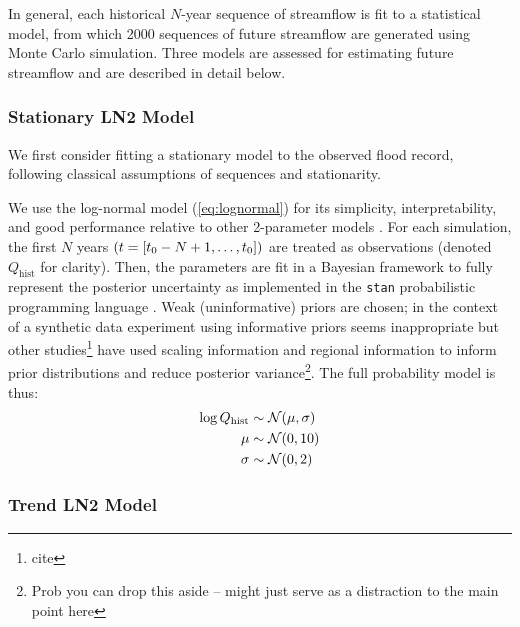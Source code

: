 \documentclass[12pt]{article}
\begin{document}
In general, each historical $N$-year sequence of streamflow is fit to a statistical model, from which 2000 sequences of future streamflow are generated using Monte Carlo simulation.
Three models are assessed for estimating future streamflow and are described in detail below.

\subsubsection{Stationary LN2 Model\label{sec:method-stationary}}

We first consider fitting a stationary model to the observed flood record, following classical assumptions of \iid sequences and stationarity.

We use the log-normal model (\cref{eq:lognormal}) for its simplicity, interpretability, and good performance relative to other 2-parameter models \citep{Vogel1996}.
For each simulation, the first $N$ years \(\qty(t=[t_0-N+1, \ldots, t_0])\) are treated as observations (denoted \(Q_{\text{hist}}\) for clarity).
Then, the parameters are fit in a Bayesian framework to fully represent the posterior uncertainty as implemented in the \texttt{stan} probabilistic programming language \citep{Carpenter2016}.
Weak (uninformative) priors are chosen; in the context of a synthetic data experiment using informative priors seems inappropriate but other studies\footnote{cite} have used scaling information and regional information to inform prior distributions and reduce posterior variance\footnote{Prob you can drop this aside -- might just serve as a distraction to the main point here}.
The full probability model is thus:
\begin{align}
  \log Q_\text{hist} & \sim \mathcal{N} \qty(\mu, \sigma) \\
  \mu &\sim \mathcal{N} \qty(0, 10) \\
  \sigma &\sim \mathcal{N} \qty(0, 2)
\end{align}

\subsubsection{Trend LN2 Model\label{sec:method-trend}}
\end{document}
